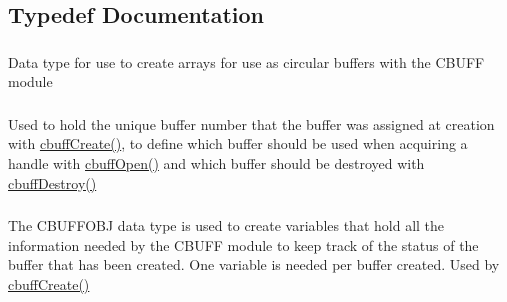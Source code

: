 \subsection{Typedef Documentation}
\hypertarget{group___c_b_u_f_fdata_types_ga4c6278cce108e0ee8bb1b9c609d0cbf4}{
\subsubsection[{CBUFF}]{}}
\label{group___c_b_u_f_fdata_types_ga4c6278cce108e0ee8bb1b9c609d0cbf4}
Data type for use to create arrays for use as circular buffers with the CBUFF module \hypertarget{group___c_b_u_f_fdata_types_gacaab9c1baaec5739b9e9629c51fd7258}{
\subsubsection[{CBUFFNUM}]{}}
\label{group___c_b_u_f_fdata_types_gacaab9c1baaec5739b9e9629c51fd7258}
Used to hold the unique buffer number that the buffer was assigned at creation with \hyperlink{group___c_b_u_f_fcreate_destroy_functions_gaeeaed884818fd76417da6347fd033a44}{cbuffCreate()}, to define which buffer should be used when acquiring a handle with \hyperlink{group___c_b_u_f_fopen_c_lose_functions_ga4b124282950602630a84fb4dded3f452}{cbuffOpen()} and which buffer should be destroyed with \hyperlink{group___c_b_u_f_fcreate_destroy_functions_ga27c64188592188aca24828740198f21c}{cbuffDestroy()} \hypertarget{group___c_b_u_f_fdata_types_ga2cbf79f31747b0f5cf01750d1d42d12f}{
\subsubsection[{CBUFFOBJ}]{}}
\label{group___c_b_u_f_fdata_types_ga2cbf79f31747b0f5cf01750d1d42d12f}
The CBUFFOBJ data type is used to create variables that hold all the information needed by the CBUFF module to keep track of the status of the buffer that has been created. One variable is needed per buffer created. Used by \hyperlink{group___c_b_u_f_fcreate_destroy_functions_gaeeaed884818fd76417da6347fd033a44}{cbuffCreate()} \hypertarget{group___c_b_u_f_fdata_types_ga554880d758aa53ae40930fbb49412e60}{
\subsubsection[{HCBUFF}]{}}
